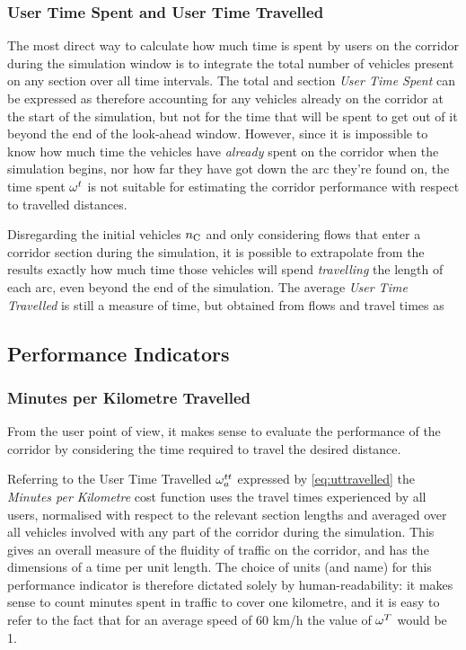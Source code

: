 \subsubsection*{User Time Spent and User Time Travelled}
The most direct way to calculate how much time is spent by users on the corridor during the simulation window is to integrate the total number of vehicles present on any section over all time intervals. The total and section \emph{User Time Spent} can be expressed as
therefore accounting for any vehicles already on the corridor at the start of the simulation, but not for the time that will be spent to get out of it beyond the end of the look-ahead window.
However, since it is impossible to know how much time the vehicles have \emph{already} spent on the corridor when the simulation begins, nor how far they have got down the arc they're found on, the time spent $\omega_{}^{t}$ is not suitable for estimating the corridor performance with respect to travelled distances. 

Disregarding the initial vehicles $n_{\mathrm{C}}$ and only considering flows that enter a corridor section during the simulation, it is possible to extrapolate from the results exactly how much time those vehicles will spend \emph{travelling} the length of each arc, even beyond the end of the simulation. The average \emph{User Time Travelled} is still a measure of time, but obtained from flows and travel times as

\subsection{Performance Indicators}

\subsubsection{Minutes per Kilometre Travelled}
From the user point of view, it makes sense to evaluate the performance of the corridor by considering the time required to travel the desired distance.

Referring to the User Time Travelled $\omega_{a}^{tt}$ expressed by \eqref{eq:uttravelled} the \emph{Minutes per Kilometre} cost function
uses the travel times experienced by all users, normalised with respect to the relevant section lengths and averaged over all vehicles involved with any part of the corridor during the simulation. This gives an overall measure of the fluidity of traffic on the corridor, and has the dimensions of a time per unit length. The choice of units (and name) for this performance indicator is therefore dictated solely by human-readability: it makes sense to count minutes spent in traffic to cover one kilometre, and it is easy to refer to the fact that for an average speed of 60 km/h the value of $\omega_{}^{T}$ would be 1.


